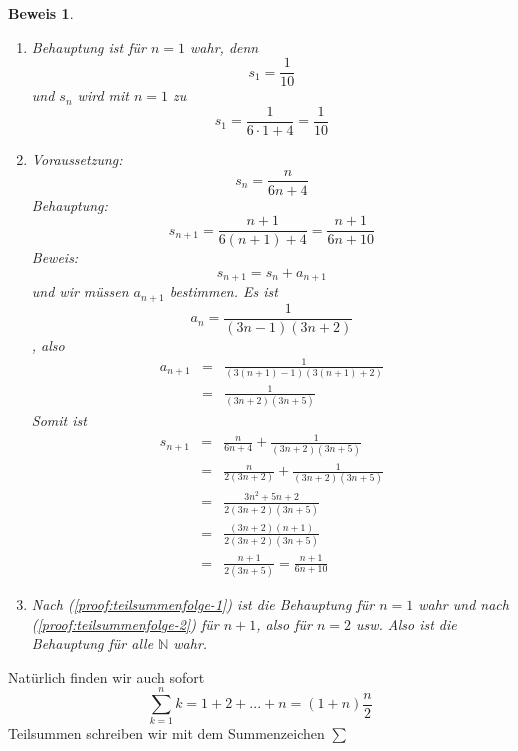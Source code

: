 \documentclass{report}
\newtheorem{myproof}{Beweis}
\begin{document}
\begin{myproof}\begin{enumerate}
\item \label{proof:teilsummenfolge-1} Behauptung ist für $n=1$ wahr, denn
\begin{equation*}s_1 = \frac{1}{10}\end{equation*}
und $s_n$ wird mit $n=1$ zu
\begin{equation*}s_1 = \frac{1}{6 \cdot 1 + 4} = \frac{1}{10}\end{equation*}
\item \label{proof:teilsummenfolge-2} Voraussetzung: 
\begin{equation*}s_n = \frac{n}{6n+4}\end{equation*}
Behauptung:
\begin{equation*}s_{n+1} = \frac{n+1}{6(n+1) + 4} = \frac{n+1}{6n+10}\end{equation*}
Beweis:
\begin{equation*}s_{n+1} = s_n + a_{n+1}\end{equation*}
und wir müssen $a_{n+1}$ bestimmen. Es ist
\begin{equation*}a_n = \frac{1}{(3n-1)(3n+2)}\end{equation*}
, also
\begin{eqnarray}a_{n+1} & = & \frac{1}{(3(n+1)-1)(3(n+1)+2)} \\
& = & \frac{1}{(3n+2)(3n+5)}\end{eqnarray}
Somit ist
\begin{eqnarray}s_{n+1} & = & \frac{n}{6n+4} + \frac{1}{(3n+2)(3n+5)} \\
& = & \frac{n}{2(3n+2)} + \frac{1}{(3n+2)(3n+5)} \\
& = & \frac{3n^2+5n+2}{2(3n+2)(3n+5)} \\
& = & \frac{(3n+2)(n+1)}{2(3n+2)(3n+5)} \\
& = & \frac{n+1}{2(3n+5)} = \frac{n+1}{6n+10}\end{eqnarray}
\item Nach (\ref{proof:teilsummenfolge-1}) ist die Behauptung für $n=1$ wahr und nach (\ref{proof:teilsummenfolge-2}) für $n+1$, also für $n=2$ usw. Also ist die Behauptung für alle $\mathbb{N}$ wahr.
\end{enumerate}\end{myproof}
Natürlich finden wir auch sofort
\begin{equation*}\sum_{k=1}^{n} k = 1 + 2 + ... + n = (1+n)\frac{n}{2}\end{equation*}
Teilsummen schreiben wir mit dem Summenzeichen $\sum$
\end{document}
